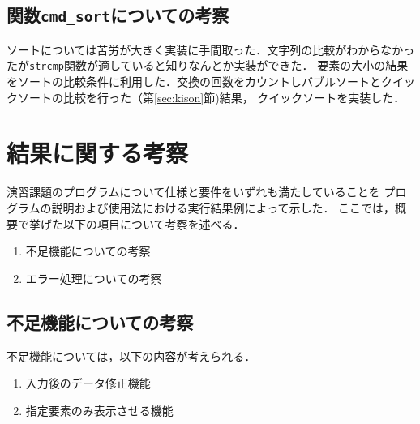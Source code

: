 \documentclass[a4j,11pt]{jarticle}
\begin{document}
\subsection{関数\texttt{cmd\_sort}についての考察}
ソートについては苦労が大きく実装に手間取った．文字列の比較がわからなかったが\verb|strcmp|関数が適していると知りなんとか実装ができた．
要素の大小の結果をソートの比較条件に利用した．交換の回数をカウントしバブルソートとクイックソートの比較を行った（第\ref{sec:kison}節)結果，
クイックソートを実装した．

\section{結果に関する考察}


演習課題のプログラムについて仕様と要件をいずれも満たしていることを
プログラムの説明および使用法における実行結果例によって示した．
ここでは，概要で挙げた以下の項目について考察を述べる．

\begin{enumerate}
\setlength{\parskip}{2pt} \setlength{\itemsep}{2pt}
    \item 不足機能についての考察
    \item エラー処理についての考察
\end{enumerate}

\subsection{不足機能についての考察}\label{sec:husoku}
不足機能については，以下の内容が考えられる．
\begin{enumerate}
\setlength{\parskip}{2pt} \setlength{\itemsep}{2pt}
   \item 入力後のデータ修正機能
   \item 指定要素のみ表示させる機能 
\end{enumerate}
\end{document}
